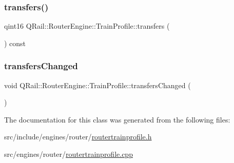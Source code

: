 \mbox{\label{classQRail_1_1RouterEngine_1_1TrainProfile_afcbc48797d5b790658f3eaa10f01c860}} 
\subsubsection{\texorpdfstring{transfers()}{transfers()}}
{\footnotesize\ttfamily qint16 Q\+Rail\+::\+Router\+Engine\+::\+Train\+Profile\+::transfers (\begin{DoxyParamCaption}{ }\end{DoxyParamCaption}) const}

\mbox{\label{classQRail_1_1RouterEngine_1_1TrainProfile_a10f6782179dec9835a7f38f8508dd396}} 
\subsubsection{\texorpdfstring{transfersChanged}{transfersChanged}}
{\footnotesize\ttfamily void Q\+Rail\+::\+Router\+Engine\+::\+Train\+Profile\+::transfers\+Changed (\begin{DoxyParamCaption}{ }\end{DoxyParamCaption})\hspace{0.3cm}{\ttfamily [signal]}}



The documentation for this class was generated from the following files\+:\begin{DoxyCompactItemize}
\item 
src/include/engines/router/\mbox{\hyperlink{routertrainprofile_8h}{routertrainprofile.\+h}}\item 
src/engines/router/\mbox{\hyperlink{routertrainprofile_8cpp}{routertrainprofile.\+cpp}}\end{DoxyCompactItemize}
